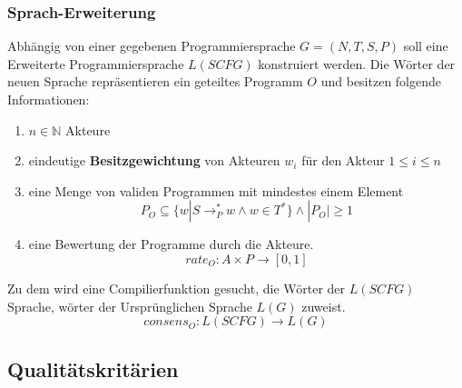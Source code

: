 \documentclass[]{article}
\begin{document}

\subsubsection{Sprach-Erweiterung}

Abhängig von einer gegebenen Programmiersprache $G=(N,T,S,P)$ soll eine Erweiterte Programmiersprache $L(SCFG)$ konstruiert werden. Die Wörter der neuen Sprache repräsentieren ein geteiltes Programm $O$ und besitzen folgende Informationen:

\begin{enumerate}
\item $n\in\mathbb{N}$ Akteure
\item eindeutige \textbf{Besitzgewichtung} von Akteuren 
  $w_i$ für den Akteur $1\leq i \leq n$
\item eine Menge von validen Programmen mit mindestes einem Element 
  $$P_O \subseteq \{w|S \rightarrow^*_P w \land w\in T^* \} \land |P_O| \geq 1$$
\item eine Bewertung der Programme durch die Akteure. 
  $$rate_O: A\times P \rightarrow [0,1]$$
\end{enumerate}

Zu dem wird eine Compilierfunktion gesucht, die Wörter der $L(SCFG)$ Sprache, wörter der Ursprünglichen Sprache $L(G)$ zuweist. 
$$ consens_O: L(SCFG) \rightarrow L(G)$$



\subsection{Qualitätskritärien}
\end{document}
